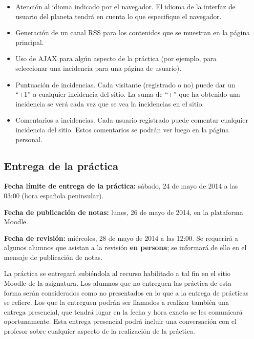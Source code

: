 \begin{itemize}
\item Atención al idioma indicado por el navegador. El idioma de la interfaz de usuario del planeta tendrá en cuenta lo que especifique el navegador.

\item Generación de un canal RSS para los contenidos que se muestran en la página principal.

\item Uso de AJAX para algún aspecto de la práctica (por ejemplo, para seleccionar una incidencia para una página de usuario).

\item Puntuación de incidencias. Cada visitante (registrado o no) puede dar un ``+1'' a cualquier incidencia del sitio. La suma de ``+'' que ha obtenido una incidencia se verá cada vez que se vea la incidencias en el sitio.

\item Comentarios a incidencias. Cada usuario registrado puede comentar cualquier incidencia del sitio. Estos comentarios se podrán ver luego en la página personal.

\end{itemize}


\subsection{Entrega de la práctica}

\textbf{Fecha límite de entrega de la práctica:} sábado, 24 de mayo de 2014 a las 03:00 (hora española peninsular).

\textbf{Fecha de publicación de notas:} lunes, 26 de mayo de 2014, en la plataforma Moodle.

\textbf{Fecha de revisión:} miércoles, 28 de mayo de 2014 a las 12:00. Se requerirá a algunos alumnos que asistan a la revisión {\bf en persona}; se informará de ello en el mensaje de publicación de notas.

La práctica se entregará subiéndola al recurso habilitado a tal fin en el sitio Moodle de la asignatura. Los alumnos que no entreguen las práctica de esta forma serán considerados como no presentados en lo que a la entrega de prácticas se refiere. Los que la entreguen podrán ser llamados a realizar también una entrega presencial, que tendrá lugar en la fecha y hora exacta se les comunicará oportunamente. Esta entrega presencial podrá incluir una conversación con el profesor sobre cualquier aspecto de la realización de la práctica.

